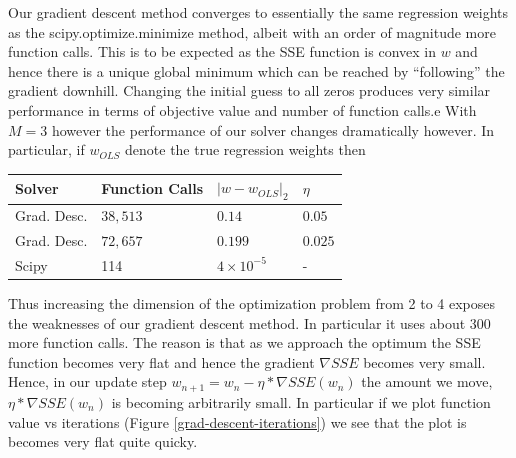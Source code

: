 \documentclass{article}
\begin{document}
Our gradient descent method converges to essentially the same regression weights as the scipy.optimize.minimize method, albeit with an order of magnitude more function calls. This is to be expected as the SSE function is convex in $w$ and hence there is a unique global minimum which can be reached by ``following'' the gradient downhill. Changing the initial guess to all zeros produces very similar performance in terms of objective value and number of function calls.e With $M=3$ however the performance of our solver changes dramatically however. In particular, if $w_{OLS}$ denote the true regression weights then

\begin{tabular}{|l|l|l|l|}
\hline
Solver & Function Calls & $|w - w_{OLS}|_2$ & $\eta$ \\ \hline
Grad. Desc. & $38,513$ & $0.14$ & $0.05$ \\ \hline
Grad. Desc. & $72, 657$ & $0.199$ & $0.025$ \\ \hline
Scipy & 114 & $4\times 10^{-5}$ & - \\ \hline
\end{tabular}
%
%

Thus increasing the dimension of the optimization problem from 2 to 4 exposes the weaknesses of our gradient descent method. In particular it uses about 300 more function calls. The reason is that as we approach the optimum the SSE function becomes very flat and hence the gradient $\nabla SSE$ becomes very small. Hence, in our update step $w_{n+1} = w_n - \eta*\nabla SSE(w_n)$ the amount we move, $\eta*\nabla SSE(w_n)$ is becoming arbitrarily small. In particular if we plot function value vs iterations (Figure \ref{grad-descent-iterations}) we see that the plot is becomes very flat quite quicky. 
\end{document}
